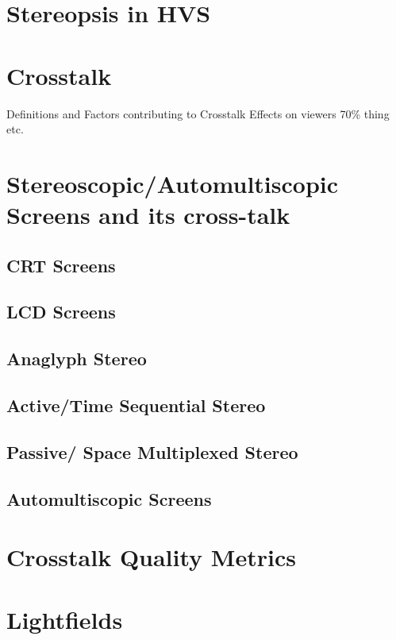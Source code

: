 \section{Stereopsis in HVS}


\section{Crosstalk}
Definitions and Factors contributing to Crosstalk
Effects on viewers
70\% thing etc.

\section{Stereoscopic/Automultiscopic Screens and its cross-talk}
\subsection{CRT Screens}
\subsection{LCD Screens}
\subsection{Anaglyph Stereo}
\subsection{Active/Time Sequential Stereo}
\subsection{Passive/ Space Multiplexed Stereo}
\subsection{Automultiscopic Screens}

\section{Crosstalk Quality Metrics}

\section{Lightfields}